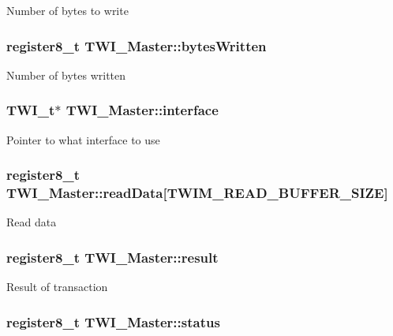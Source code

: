 Number of bytes to write \hypertarget{struct_t_w_i___master_a7fad10bdf554d3ab318b83c2f384f29a}{
\subsubsection[{bytes\-Written}]{\setlength{\rightskip}{0pt plus 5cm}register8\-\_\-t T\-W\-I\-\_\-\-Master\-::bytes\-Written}}\label{struct_t_w_i___master_a7fad10bdf554d3ab318b83c2f384f29a}
Number of bytes written \hypertarget{struct_t_w_i___master_ad00bb11bf1747236879a7e733b232838}{
\subsubsection[{interface}]{\setlength{\rightskip}{0pt plus 5cm}T\-W\-I\-\_\-t$\ast$ T\-W\-I\-\_\-\-Master\-::interface}}\label{struct_t_w_i___master_ad00bb11bf1747236879a7e733b232838}
Pointer to what interface to use \hypertarget{struct_t_w_i___master_aac0c87e8f5d8ae80e507ccf0c63f7c71}{
\subsubsection[{read\-Data}]{\setlength{\rightskip}{0pt plus 5cm}register8\-\_\-t T\-W\-I\-\_\-\-Master\-::read\-Data\mbox{[}T\-W\-I\-M\-\_\-\-R\-E\-A\-D\-\_\-\-B\-U\-F\-F\-E\-R\-\_\-\-S\-I\-Z\-E\mbox{]}}}\label{struct_t_w_i___master_aac0c87e8f5d8ae80e507ccf0c63f7c71}
Read data \hypertarget{struct_t_w_i___master_ac9aada323447f8e15387c7bf302b2a75}{
\subsubsection[{result}]{\setlength{\rightskip}{0pt plus 5cm}register8\-\_\-t T\-W\-I\-\_\-\-Master\-::result}}\label{struct_t_w_i___master_ac9aada323447f8e15387c7bf302b2a75}
Result of transaction \hypertarget{struct_t_w_i___master_a4213be5b8a0e683ea1ea46b73871af2d}{
\subsubsection[{status}]{\setlength{\rightskip}{0pt plus 5cm}register8\-\_\-t T\-W\-I\-\_\-\-Master\-::status}}\label{struct_t_w_i___master_a4213be5b8a0e683ea1ea46b73871af2d}
